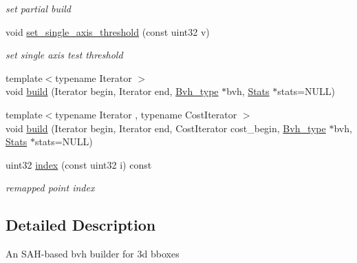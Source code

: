 \begin{DoxyCompactItemize}
\begin{DoxyCompactList}\small\item\em set partial build \end{DoxyCompactList}\item 
\hypertarget{classnih_1_1_bvh__sah__builder_a6f0353261ef5cfc1dae643d779f6e277}{
void \hyperlink{classnih_1_1_bvh__sah__builder_a6f0353261ef5cfc1dae643d779f6e277}{set\-\_\-single\-\_\-axis\-\_\-threshold} (const uint32 v)}
\label{classnih_1_1_bvh__sah__builder_a6f0353261ef5cfc1dae643d779f6e277}

\begin{DoxyCompactList}\small\item\em set single axis test threshold \end{DoxyCompactList}\item 
{\footnotesize template$<$typename Iterator $>$ }\\void \hyperlink{classnih_1_1_bvh__sah__builder_aa056c2970c0dcf4f155f90f7a56355eb}{build} (\-Iterator begin, \-Iterator end, \hyperlink{structnih_1_1_bvh}{\-Bvh\-\_\-type} $\ast$bvh, \hyperlink{structnih_1_1_bvh__sah__builder_1_1_stats}{\-Stats} $\ast$stats=\-N\-U\-L\-L)
\item 
{\footnotesize template$<$typename Iterator , typename Cost\-Iterator $>$ }\\void \hyperlink{classnih_1_1_bvh__sah__builder_a269b237d912be53b8483c63d7c9e06fe}{build} (\-Iterator begin, \-Iterator end, \-Cost\-Iterator cost\-\_\-begin, \hyperlink{structnih_1_1_bvh}{\-Bvh\-\_\-type} $\ast$bvh, \hyperlink{structnih_1_1_bvh__sah__builder_1_1_stats}{\-Stats} $\ast$stats=\-N\-U\-L\-L)
\item 
\hypertarget{classnih_1_1_bvh__sah__builder_a8a807a067d1870d23313781ee76a9e34}{
uint32 \hyperlink{classnih_1_1_bvh__sah__builder_a8a807a067d1870d23313781ee76a9e34}{index} (const uint32 i) const }
\label{classnih_1_1_bvh__sah__builder_a8a807a067d1870d23313781ee76a9e34}

\begin{DoxyCompactList}\small\item\em remapped point index \end{DoxyCompactList}\end{DoxyCompactItemize}


\subsection{\-Detailed \-Description}
\-An \-S\-A\-H-\/based bvh builder for 3d bboxes 

